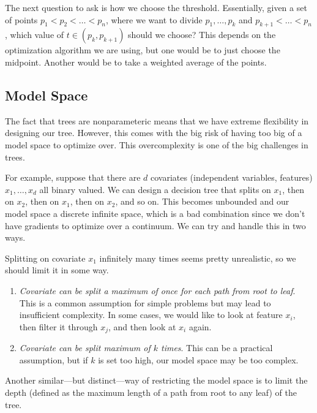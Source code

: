   The next question to ask is how we choose the threshold. Essentially, given a set of points $p_1 < p_2 < \ldots < p_n$, where we want to divide $p_1, \ldots, p_k$ and $p_{k+1} < \ldots < p_n$, which value of $t \in (p_k, p_{k+1})$ should we choose? This depends on the optimization algorithm we are using, but one would be to just choose the midpoint. Another would be to take a weighted average of the points. 

\subsection{Model Space} 

  The fact that trees are nonparameteric means that we have extreme flexibility in designing our tree. However, this comes with the big risk of having too big of a model space to optimize over. This overcomplexity is one of the big challenges in trees. 

  For example, suppose that there are $d$ covariates (independent variables, features) $x_1, \ldots, x_d$ all binary valued. We can design a decision tree that splits on $x_1$, then on $x_2$, then on $x_1$, then on $x_2$, and so on. This becomes unbounded and our model space a discrete infinite space, which is a bad combination since we don't have gradients to optimize over a continuum. We can try and handle this in two ways. 

  \begin{example}
    \label{ex:splitting-on-same-variable-multiple-times}
    Splitting on covariate $x_1$ infinitely many times seems pretty unrealistic, so we should limit it in some way. 
    \begin{enumerate}
      \item \textit{Covariate can be split a maximum of once for each path from root to leaf}. This is a common assumption for simple problems but may lead to insufficient complexity. In some cases, we would like to look at feature $x_i$, then filter it through $x_j$, and then look at $x_i$ again.
      \item \textit{Covariate can be split maximum of $k$ times}. This can be a practical assumption, but if $k$ is set too high, our model space may be too complex. 
    \end{enumerate}
  \end{example}

  \begin{example}
    \label{ex:depth-of-tree}
    Another similar---but distinct---way of restricting the model space is to limit the depth (defined as the maximum length of a path from root to any leaf) of the tree. 
  \end{example} 
  
